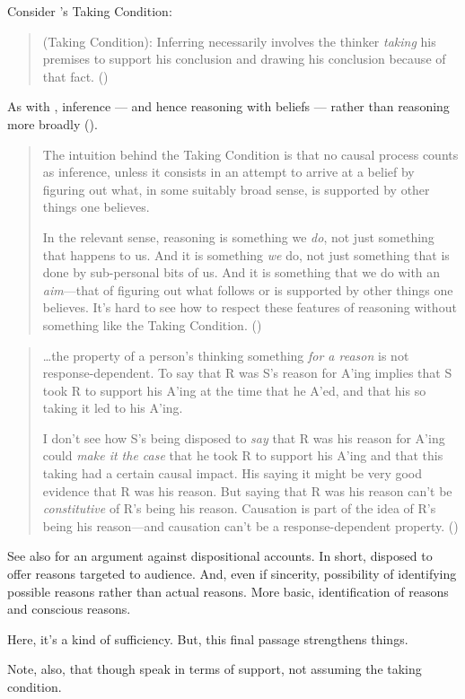 \begin{note}[Boghossian]
  Consider \citeauthor{Boghossian:2014aa}'s Taking Condition:
  \begin{quote}
    (Taking Condition): Inferring necessarily involves the thinker \emph{taking} his premises to support his conclusion and drawing his conclusion because of that fact.%
    \mbox{}\hfill\mbox{(\Citeyear[5]{Boghossian:2014aa})}
  \end{quote}
  As with \citeauthor{Armstrong:1968vh}, inference --- and hence reasoning with beliefs --- rather than reasoning more broadly (\Citeyear[cf][2]{Boghossian:2014aa}).

  \begin{quote}
    The intuition behind the Taking Condition is that no causal process counts as inference, unless it consists in an attempt to arrive at a belief by figuring out what, in some suitably broad sense, is supported by other things one believes.

    In the relevant sense, reasoning is something we \emph{do}, not just something that happens to us.
    And it is something \emph{we} do, not just something that is done by sub-personal bits of us.
    And it is something that we do with an \emph{aim}---that of figuring out what follows or is supported by other things one believes.
    It's hard to see how to respect these features of reasoning without something like the Taking Condition.%
    \mbox{}\hfill\mbox{(\Citeyear[5]{Boghossian:2014aa})}
  \end{quote}

  \begin{quote}
    \dots the property of a person's thinking something \emph{for a reason} is not response-dependent.
    To say that R was S's reason for A'ing implies that S took R to support his A'ing at the time that he A'ed, and that his so taking it led to his A'ing.

    I don't see how S's being disposed to \emph{say} that R was his reason for A'ing could \emph{make it the case} that he took R to support his A'ing and that this taking had a certain causal impact.
    His saying it might be very good evidence that R was his reason.
    But saying that R was his reason can't be \emph{constitutive} of R's being his reason.
    Causation is part of the idea of R's being his reason---and causation can't be a response-dependent property.%
    \mbox{}\hfill\mbox{(\citeyear[10--11]{Boghossian:2014aa})}
  \end{quote}

  {
    \color{red}
    See also \textcite[26--28]{Harman:1973ww} for an argument against dispositional accounts.
    In short, disposed to offer reasons targeted to audience.
    And, even if sincerity, possibility of identifying possible reasons rather than actual reasons.
    More basic, identification of reasons and conscious reasons.
  }

  {
    \color{red}
    Here, it's a kind of sufficiency.
    But, this final passage strengthens things.
  }

  {
    \color{green}
    Note, also, that though speak in terms of support, not assuming the taking condition.
  }
\end{note}


